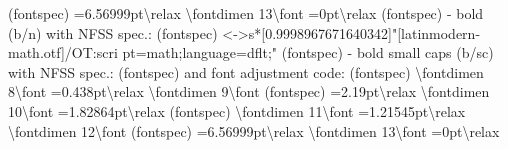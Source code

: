 \documentclass[
  letterpaper,
  DIV=11,
  numbers=noendperiod]{scrartcl}
\newenvironment{Shaded}{\begin{snugshade}}{\end{snugshade}}
\newcommand{\NormalTok}[1]{\textcolor[rgb]{0.00,0.23,0.31}{#1}}
\begin{document}
\begin{Shaded}
\begin{Highlighting}[]
\NormalTok{(fontspec)             =6.56999pt\textbackslash{}relax \textbackslash{}fontdimen 13\textbackslash{}font =0pt\textbackslash{}relax }
\NormalTok{(fontspec)             {-} \textquotesingle{}bold\textquotesingle{} (b/n) with NFSS spec.:}
\NormalTok{(fontspec)             \textless{}{-}\textgreater{}s*[0.9998967671640342]"[latinmodern{-}math.otf]/OT:scri}
\NormalTok{pt=math;language=dflt;"}
\NormalTok{(fontspec)             {-} \textquotesingle{}bold small caps\textquotesingle{}  (b/sc) with NFSS spec.: }
\NormalTok{(fontspec)             and font adjustment code:}
\NormalTok{(fontspec)             \textbackslash{}fontdimen 8\textbackslash{}font =0.438pt\textbackslash{}relax \textbackslash{}fontdimen 9\textbackslash{}font}
\NormalTok{(fontspec)             =2.19pt\textbackslash{}relax \textbackslash{}fontdimen 10\textbackslash{}font =1.82864pt\textbackslash{}relax}
\NormalTok{(fontspec)             \textbackslash{}fontdimen 11\textbackslash{}font =1.21545pt\textbackslash{}relax \textbackslash{}fontdimen 12\textbackslash{}font}
\NormalTok{(fontspec)             =6.56999pt\textbackslash{}relax \textbackslash{}fontdimen 13\textbackslash{}font =0pt\textbackslash{}relax }


\end{Highlighting}
\end{Shaded}
\end{document}
